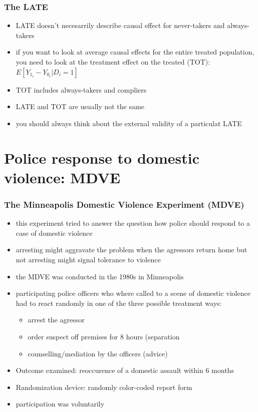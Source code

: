 \documentclass{beamer}
\begin{document}
\begin{frame}
\frametitle{The LATE}
\begin{itemize}
\item LATE doesn't necesarrily describe causal effect for never-takers and always-takers
\item if you want to look at average causal effects for the entire treated population, you need to look at the treatment effect on the treated (TOT): $E[Y_1_i - Y_0_i|D_i =1]$ 
\item TOT includes always-takers and compliers
\item LATE and TOT are usually not the same
\item you should always think about the external validity of a particulat LATE
\end{itemize}
\end{frame}




\section{Police response to domestic violence: MDVE} 

\begin{frame}
\frametitle{The Minneapolis Domestic Violence Experiment (MDVE)}
\begin{itemize}
\item this experiment tried to answer the question how police should respond to a case of domestic violence
\item arresting might aggravate the problem when the agressors return home but not arresting might signal tolerance to violence
\item the MDVE was conducted in the 1980s in Minneapolis
\item participating police officers who where called to a scene of domestic violence had to react randomly in one of the three possible treatment ways:
	\begin{itemize}
		\item arrest the agressor
		\item order suspect off premises for 8 hours (separation
		\item counselling/mediation by the officers (advice)
	\end{itemize}
\item Outcome examined: reoccurence of a domestic assault within 6 months
\item Randomization device: randomly color-coded report form
\item participation was voluntarily
\end{itemize}

\end{frame}
\end{document}

